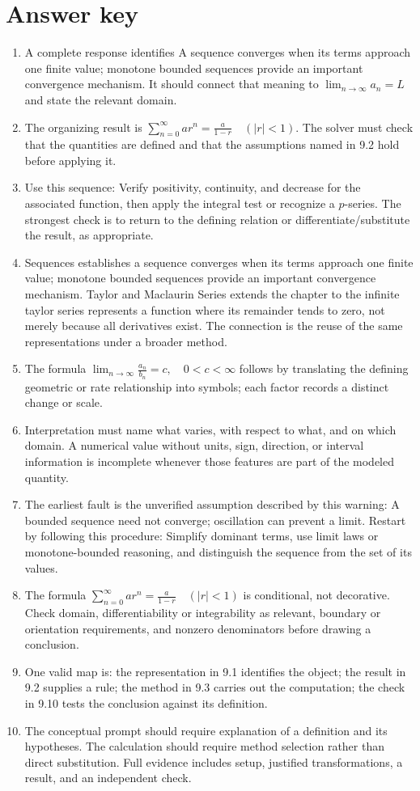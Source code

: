 \documentclass[11pt]{article}
\begin{document}
\section{Answer key}
\small
\begin{enumerate}
\item A complete response identifies A sequence converges when its terms approach one finite value; monotone bounded sequences provide an important convergence mechanism. It should connect that meaning to \(\lim_{n\to\infty}a_n=L\) and state the relevant domain.
\item The organizing result is \(\sum_{n=0}^{\infty}ar^n=\frac{a}{1-r}\quad(|r|<1)\). The solver must check that the quantities are defined and that the assumptions named in 9.2 hold before applying it.
\item Use this sequence: Verify positivity, continuity, and decrease for the associated function, then apply the integral test or recognize a $p$-series. The strongest check is to return to the defining relation or differentiate/substitute the result, as appropriate.
\item Sequences establishes a sequence converges when its terms approach one finite value; monotone bounded sequences provide an important convergence mechanism. Taylor and Maclaurin Series extends the chapter to the infinite taylor series represents a function where its remainder tends to zero, not merely because all derivatives exist. The connection is the reuse of the same representations under a broader method.
\item The formula \(\lim_{n\to\infty}\frac{a_n}{b_n}=c,\quad 0<c<\infty\) follows by translating the defining geometric or rate relationship into symbols; each factor records a distinct change or scale.
\item Interpretation must name what varies, with respect to what, and on which domain. A numerical value without units, sign, direction, or interval information is incomplete whenever those features are part of the modeled quantity.
\item The earliest fault is the unverified assumption described by this warning: A bounded sequence need not converge; oscillation can prevent a limit. Restart by following this procedure: Simplify dominant terms, use limit laws or monotone-bounded reasoning, and distinguish the sequence from the set of its values.
\item The formula \(\sum_{n=0}^{\infty}ar^n=\frac{a}{1-r}\quad(|r|<1)\) is conditional, not decorative. Check domain, differentiability or integrability as relevant, boundary or orientation requirements, and nonzero denominators before drawing a conclusion.
\item One valid map is: the representation in 9.1 identifies the object; the result in 9.2 supplies a rule; the method in 9.3 carries out the computation; the check in 9.10 tests the conclusion against its definition.
\item The conceptual prompt should require explanation of a definition and its hypotheses. The calculation should require method selection rather than direct substitution. Full evidence includes setup, justified transformations, a result, and an independent check.
\end{enumerate}
\end{document}
